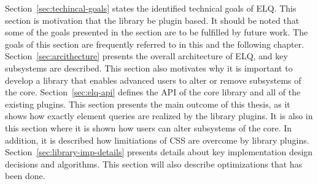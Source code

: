 \documentclass[a4paper,11pt]{kth-mag}
\begin{document}
    Section~\ref{sec:techincal-goals} states the identified technical goals of \gls{ELQ}.
    This section is motivation that the library be plugin based.
    It should be noted that some of the goals presented in the section are to be fulfilled by future work.
    The goals of this section are frequently referred to in this and the following chapter.
    Section~\ref{sec:arcithecture} presents the overall architecture of \gls{ELQ}, and key subsystems are described.
    This section also motivates why it is important to develop a library that enables advanced users to alter or remove subsystems of the core.
    Section~\ref{sec:elq-api} defines the \gls{API} of the core library and all of the existing plugins.
    This section presents the main outcome of this thesis, as it shows how exactly element queries are realized by the library plugins.
    It is also in this section where it is shown how users can alter subsystems of the core.
    In addition, it is described how limitiations of \gls{CSS} are overcome by library plugins.
    Section~\ref{sec:library-imp-details} presents details about key implementation design decisions and algorithms.
    This section will also describe optimizations that has been done.


\end{document}
